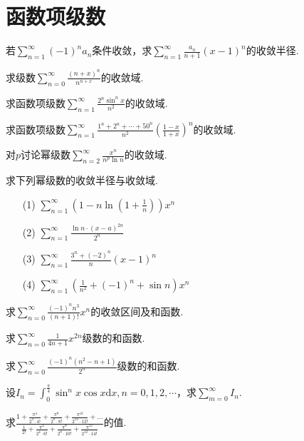 \section{函数项级数}
\begin{xiti}
	\item 	若$\sum _ { n = 1 } ^ { \infty } ( - 1 ) ^ { n } a _ { n }$条件收敛，求$\sum _ { n = 1 } ^ { \infty } \frac { a _ { n } } { n + 1 } ( x - 1 ) ^ { n }$的收敛半径.
	\item 求级数$\sum _ { n = 0 } ^ { \infty } \frac { ( n + x ) ^ { n } } { n ^ { n + x } }$的收敛域.
	\item 求函数项级数$\sum _ { n = 1 } ^ { \infty } \frac { 2 ^ { n } \sin ^ { n } x } { n ^ { 2 } }$的收敛域.
	\item 求函数项级数$\sum _ { n = 1 } ^ { \infty } \frac { 1 ^ { n } + 2 ^ { n } + \cdots + 50 ^ { n } } { n ^ { 2 } } \left( \frac { 1 - x } { 1 + x } \right) ^ { n }$的收敛域.
	\item 对$p$讨论幂级数$\sum _ { n = 2 } ^ { \infty } \frac { x ^ { n } } { n ^ { p } \ln n }$的收敛域.
	\item 求下列幂级数的收敛半径与收敛域.
	\begin{enumerate}
		\item [(1)]$\sum _ { n = 1 } ^ { \infty } \left( 1 - n \ln \left( 1 + \frac { 1 } { n } \right) \right) x ^ { n }$
		\item [(2)]$\sum _ { n = 1 } ^ { \infty } \frac { \ln n \cdot ( x - a ) ^ { 2 n } } { 2 ^ { n } }$
		\item [(3)]$\sum _ { n = 1 } ^ { \infty } \frac { 3 ^ { n } + ( - 2 ) ^ { n } } { n } ( x - 1 ) ^ { n }$
		\item [(4)]$\sum _ { n = 1 } ^ { \infty } \left( \frac { 1 } { n ^ { 2 } } + ( - 1 ) ^ { n } + \sin n \right) x ^ { n }$
	\end{enumerate}
	\item 求$\sum _ { n = 0 } ^ { \infty } \frac { ( - 1 ) ^ { n } n ^ { 3 } } { ( n + 1 ) ! } x ^ { n }$的收敛区间及和函数.
	\item 求$\sum _ { n = 0 } ^ { \infty } \frac { 1 } { 4 n + 1 } x ^ { 2 n }$级数的和函数.
	\item 求$\sum _ { n = 0 } ^ { \infty } \frac { ( - 1 ) ^ { n } \left( n ^ { 2 } - n + 1 \right) } { 2 ^ { n } }$级数的和函数.
	\item 设$I _ { n } = \int _ { 0 } ^ { \frac { \pi } { 4 } } \sin ^ { n } x \cos x \mathrm { d } x , n = 0,1,2 , \cdots$，求$\sum _ { m = 0 } ^ { \infty } I _ { n }$.
	\item 求$\frac { 1 + \frac { \pi ^ { 4 } } { 2 ^ { 4 } \cdot 4 ! } + \frac { \pi ^ { 8 } } { 2 ^ { 8 } \cdot 8 ! } + \frac { \pi ^ { 12 } } { 2 ^ { 12 } \cdot 12 ! } + \ldots } { \frac { 1 } { 2 ! } + \frac { \pi ^ { 4 } } { 2 ^ { 4 } \cdot 6 ! } + \frac { \pi ^ { 8 } } { 2 ^ { 8 } \cdot 10 ! } + \frac { \pi ^ { 12 } } { 2 ^ { 12 } \cdot 14 ! } }$的值.

\end{xiti}
